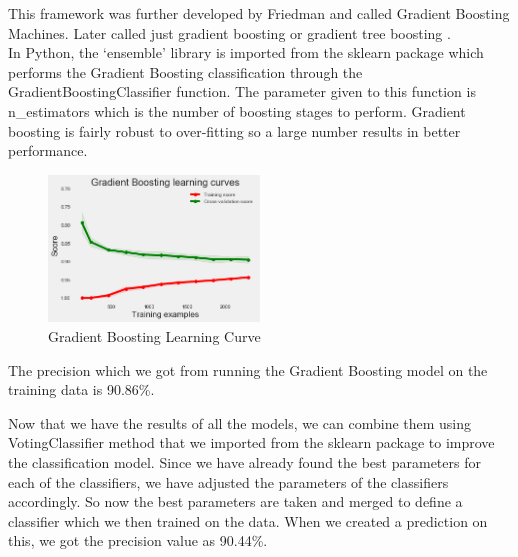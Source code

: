 This framework was further developed by Friedman and called Gradient Boosting Machines. Later called just gradient boosting or gradient tree boosting \cite{link15}.\\
In Python, the `ensemble' library is imported from the sklearn package which performs the Gradient Boosting classification through the GradientBoostingClassifier function. The parameter given to this function is n\_estimators which is the number of boosting stages to perform. Gradient boosting is fairly robust to over-fitting so a large number results in better performance.

\begin{figure}[H]
\caption{Gradient Boosting Learning Curve}
\label{5.4}
\centering
\includegraphics[width=0.5\textwidth]{images/5_4.png}
\end{figure}

The precision which we got from running the Gradient Boosting model on the training data is 90.86\%.

Now that we have the results of all the models, we can combine them using VotingClassifier method that we imported from the sklearn package to improve the classification model. Since we have already found the best parameters for each of the classifiers, we have adjusted the parameters of the classifiers accordingly. So now the best parameters are taken and merged to define a classifier which  we then trained on the data. When we created a prediction on this, we got the precision value as 90.44\%.

